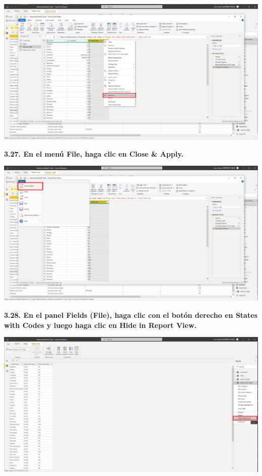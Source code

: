 \documentclass{article}
\begin{document}
    \begin{center}
		\includegraphics[width=14cm]{./images/74} 
	\end{center}
\newpage
\textbf{3.27. En el menú \textbf{File}, haga clic en \textbf{Close \& Apply}.}

    \begin{center}
		\includegraphics[width=14cm]{./images/75} 
	\end{center}

\textbf{3.28. En el panel \textbf{Fields} \textbf{(File)}, haga clic con el botón derecho en \textbf{States with Codes} y luego haga clic en \textbf{Hide in Report View}.}

    \begin{center}
		\includegraphics[width=14cm]{./images/76} 
	\end{center}
\end{document}
